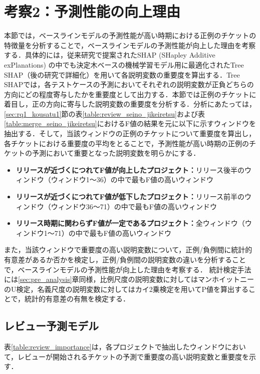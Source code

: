 \documentclass[submit]{ipsj}
\begin{document}
\section{考察2：予測性能の向上理由}\label{sec:rq1_kousatu2}
本節では，ベースラインモデルの予測性能が高い時期における正例のチケットの特徴量を分析することで，ベースラインモデルの予測性能が向上した理由を考察する．具体的には，従来研究\cite{shap}で提案されたSHAP (SHapley Additive exPlanations) の中でも決定木ベースの機械学習モデル用に最適化されたTree SHAP（後の研究\cite{TreeSHAP}で詳細化）を用いて各説明変数の重要度を算出する．Tree SHAPでは，各テストケースの予測においてそれぞれの説明変数が正負どちらの方向にどの程度寄与したかを重要度として出力する．本節では正例のチケットに着目し，正の方向に寄与した説明変数の重要度を分析する．分析にあたっては，\ref{sec:rq1_kousatu1}節の表\ref{table:review_seino_jikeiretsu}および表\ref{table:merge_seino_jikeiretsu}におけるF値の結果を元に以下に示すウィンドウを抽出する．そして，当該ウィンドウの正例のチケットについて重要度を算出し，各チケットにおける重要度の平均をとることで，予測性能が高い時期の正例のチケットの予測において重要となった説明変数を明らかにする．

\begin{itemize}
  \item \textbf{リリースが近づくにつれてF値が向上したプロジェクト：}リリース後半のウィンドウ（ウィンドウ1〜36）の中で最もF値の高いウィンドウ
  \item \textbf{リリースが近づくにつれてF値が低下したプロジェクト：}リリース前半のウィンドウ（ウィンドウ36〜71）の中で最もF値の高いウィンドウ
  \item \textbf{リリース時期に関わらずF値が一定であるプロジェクト：}全ウィンドウ（ウィンドウ1〜71）の中で最もF値の高いウィンドウ
\end{itemize}

また，当該ウィンドウで重要度の高い説明変数について，正例/負例間に統計的有意差があるか否かを検定し，正例/負例間の説明変数の違いを分析することで，ベースラインモデルの予測性能が向上した理由を考察する．
統計検定手法には\ref{sec:pre_analysis}章同様，比例尺度の説明変数に対してはマンホイットニーのU検定，名義尺度の説明変数に対してはカイ2乗検定を用いてP値を算出することで，統計的有意差の有無を検定する．


\subsection{レビュー予測モデル}\label{sec:rq1_kousatu2_review}
表\ref{table:review_importance}は，各プロジェクトで抽出したウィンドウにおいて，レビューが開始されるチケットの予測で重要度の高い説明変数と重要度を示す．
\end{document}
